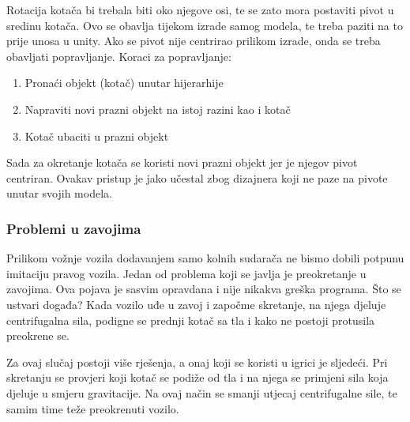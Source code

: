 Rotacija kotača bi trebala biti oko njegove osi, te se zato mora postaviti pivot u sredinu kotača. Ovo se obavlja tijekom izrade samog modela, te treba paziti na to prije unosa u unity. Ako se pivot nije centrirao prilikom izrade, onda se treba obavljati popravljanje. Koraci za popravljanje:

\begin{enumerate}
	\item Pronaći objekt (kotač) unutar hijerarhije
	\item Napraviti novi prazni objekt na istoj razini kao i kotač
	\item Kotač ubaciti u prazni objekt
\end{enumerate}
Sada za okretanje kotača se koristi novi prazni objekt jer je njegov pivot centriran. Ovakav pristup je jako učestal zbog dizajnera koji ne paze na pivote unutar svojih modela.

\subsubsection{Problemi u zavojima}
Prilikom vožnje vozila dodavanjem samo kolnih sudarača ne bismo dobili potpunu imitaciju pravog vozila. Jedan od problema koji se javlja je preokretanje u zavojima. Ova pojava je sasvim opravdana i nije nikakva greška programa. Što se ustvari događa? Kada vozilo uđe u zavoj i započme skretanje, na njega djeluje centrifugalna sila, podigne se prednji kotač sa tla i kako ne postoji protusila preokrene se. \par
Za ovaj slučaj postoji više rješenja, a onaj koji se koristi u igrici je sljedeći. Pri skretanju se provjeri koji kotač se podiže od tla i na njega se primjeni sila koja djeluje u smjeru gravitacije. Na ovaj način se smanji utjecaj centrifugalne sile, te samim time teže preokrenuti vozilo.